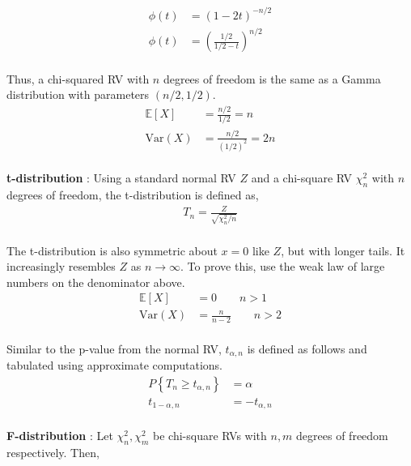 \begin{align}
	\phi(t) &= (1-2t)^{-n/2} \\[1ex]
	\phi(t) &= \left(\frac{1/2}{1/2 - t}\right)^{n/2} \nonumber
\end{align} \\

Thus, a chi-squared RV with $ n $ degrees of freedom is the same as a Gamma distribution with parameters $ (n/2, 1/2) $. \\

\begin{align}
	\mathbb{E}[X] &= \frac{n/2}{1/2} = n \\[1ex]
	\mathrm{Var}(X) &= \frac{n/2}{(1/2)^2} = 2n
\end{align}\\

\textbf{t-distribution} : Using a standard normal RV $ Z $ and a chi-square RV $ \chi_n^2 $ with $ n $ degrees of freedom, the t-distribution is defined as, \\

\begin{align}
	T_n = \frac{Z}{\sqrt{\chi_n^2 / n}}
\end{align}\\

The t-distribution is also symmetric about $ x=0 $ like $ Z $, but with longer tails. It increasingly resembles $ Z $ as $ n \to \infty $. To prove this, use the weak law of large numbers on the denominator above.\\

\begin{align}
	\mathbb{E}[X] &= 0 \qquad n>1 \\[1ex]
	\mathrm{Var}(X) &= \frac{n}{n-2} \qquad n>2
\end{align}\\

Similar to the p-value from the normal RV, $ t_{\alpha, n} $ is defined as follows and tabulated using approximate computations. \\

\begin{align}
	P \left\{T_n \geq t_{\alpha, n} \right\} &= \alpha \\[1ex]
	t_{1-\alpha, n} &= -t_{\alpha, n} \nonumber
\end{align} \\

\textbf{F-distribution} : Let $ \chi_n^2, \chi_m^2 $ be chi-square RVs with $ n, m $ degrees of freedom respectively. Then,\\

